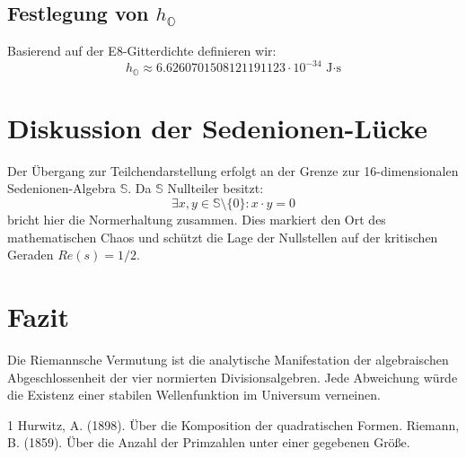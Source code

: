 \documentclass{article}
\begin{document}
	\subsection{Festlegung von $h_{\mathbb{O}}$}
	Basierend auf der E8-Gitterdichte definieren wir:
	\begin{equation}
		h_{\mathbb{O}} \approx 6.6260701508121191123 \cdot 10^{-34} \text{ J·s}
	\end{equation}
	
	\section{Diskussion der Sedenionen-Lücke}
	Der Übergang zur Teilchendarstellung erfolgt an der Grenze zur 16-dimensionalen Sedenionen-Algebra $\mathbb{S}$. Da $\mathbb{S}$ Nullteiler besitzt:
	\begin{equation}
		\exists x, y \in \mathbb{S} \setminus \{0\} : x \cdot y = 0
	\end{equation}
	bricht hier die Normerhaltung zusammen. Dies markiert den Ort des mathematischen Chaos und schützt die Lage der Nullstellen auf der kritischen Geraden $Re(s) = 1/2$.
	
	\section{Fazit}
	Die Riemannsche Vermutung ist die analytische Manifestation der algebraischen Abgeschlossenheit der vier normierten Divisionsalgebren. Jede Abweichung würde die Existenz einer stabilen Wellenfunktion im Universum verneinen.
	
	
	\begin{thebibliography}{1}
		 Hurwitz, A. (1898). Über die Komposition der quadratischen Formen.
		 Riemann, B. (1859). Über die Anzahl der Primzahlen unter einer gegebenen Größe.
	\end{thebibliography}
	
\end{document}
